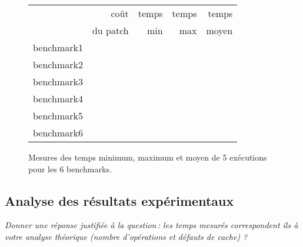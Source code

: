 \documentclass[a4paper, 10pt, french]{article}
\begin{document}
    \begin{figure}[h]
      \begin{center}
        \begin{tabular}{|l||r||r|r|r||}
          \hline
          \hline
            & coût         & temps     & temps   & temps \\
            & du patch     & min       & max     & moyen \\
          \hline
          \hline
            benchmark1 &      &     &     &     \\
          \hline
            benchmark2 &      &     &     &     \\
          \hline
            benchmark3 &      &     &     &     \\
          \hline
            benchmark4 &      &     &     &     \\
          \hline
            benchmark5 &      &     &     &     \\
          \hline
            benchmark6 &      &     &     &     \\
          \hline
          \hline
        \end{tabular}
        \caption{Mesures des temps minimum, maximum et moyen de 5 exécutions pour les 6 benchmarks.}
        \label{table-temps}
      \end{center}
    \end{figure}

\subsection{Analyse des résultats expérimentaux}
{\em Donner  une réponse justifiée  à la question\,:
              les  temps mesurés correspondent ils  à votre analyse théorique (nombre d’opérations et défauts de cache) ?
}

\end{document}
